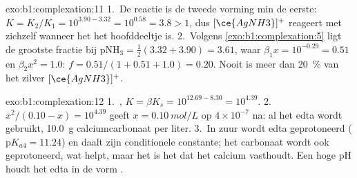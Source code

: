 \begin{solution}{exo:b1:complexation:11}
1.~De reactie is de tweede vorming min de eerste: $K = K_2/K_1 =
10^{3.90 - 3.32} = 10^{0.58} = 3.8 > 1$, dus $[\ce{AgNH3}]^{+}$ reageert
met zichzelf wanneer het het hoofddeeltje is.
2.~Volgens \cref{exo:b1:complexation:5} ligt de grootste fractie bij
$\mathrm{pNH_3} = \frac12(3.32 + 3.90) = 3.61$, waar $\beta_1 x = 10^{-0.29}
= 0.51$ en $\beta_2x^2 = 1.0$: $f = 0.51/(1 + 0.51 + 1.0) = 0.20$. Nooit
is meer dan \qty{20}{\percent} van het zilver $[\ce{AgNH3}]^{+}$.
\end{solution}

\begin{solution}{exo:b1:complexation:12}
1.~, $K = \beta K_s = 10^{12.69 -
8.30} = 10^{4.39}$.
2.~$x^2/(0.10 - x) = 10^{4.39}$ geeft $x = \qty{0.10}{mol/L}$ op
$4 \times 10^{-7}$ na: al het edta wordt gebruikt, \qty{10.0}{g}
calciumcarbonaat per liter.
3.~In zuur wordt edta geprotoneerd ($\mathrm{p}K_{a4} = 11.24$) en daalt
zijn conditionele constante; het carbonaat wordt ook geprotoneerd, wat
helpt, maar het is het  dat het calcium vasthoudt. Een hoge pH
houdt het edta in de vorm .
\end{solution}

